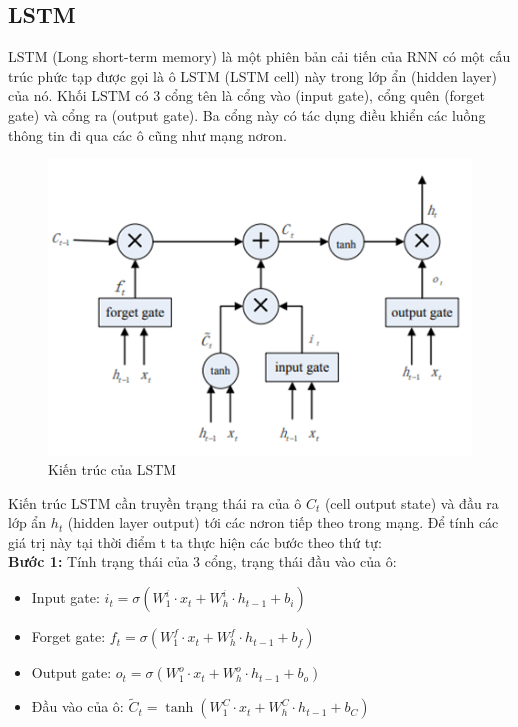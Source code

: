\documentclass[conference]{IEEEtran}
\begin{document}
\subsection{LSTM}
LSTM (Long short-term memory) là một phiên bản cải tiến của RNN có một cấu trúc phức tạp được gọi là ô LSTM (LSTM cell) này trong lớp ẩn (hidden layer) của nó. Khối LSTM có 3 cổng tên là cổng vào (input gate), cổng quên (forget gate) và cổng ra (output gate). Ba cổng này có tác dụng điều khiển các luồng thông tin đi qua các ô cũng như mạng nơron. \cite{LSTM} 
\begin{figure}[H]
    \centering
    \begin{minipage}{0.8\linewidth}
    \centering
        \vspace{0pt}
        \includegraphics[width=0.8\linewidth]{images/LSTM.png}
        \vspace{0pt}
    \caption{Kiến trúc của LSTM}
    \label{fig9}
    \end{minipage}
\end{figure}
Kiến trúc LSTM cần truyền trạng thái ra của ô $C_t$ (cell output state) và đầu ra lớp ẩn $h_t$ (hidden layer output) tới các nơron tiếp theo trong mạng. Để tính các giá trị này tại thời điểm t ta thực hiện các bước theo thứ tự: \\
\textbf{Bước 1:} Tính trạng thái của 3 cổng, trạng thái đầu vào của ô:
\begin{itemize}
    \item Input gate:
    \(
    i_t = \sigma\left(W_1^i \cdot x_t + W_h^i \cdot h_{t-1} + b_i\right)
    \)
    \item Forget gate:
    \(f_t = \sigma\left(W_1^f \cdot x_t + W_h^f \cdot h_{t-1} + b_f\right)\)
    \item Output gate:
    \(o_t = \sigma\left(W_1^o \cdot x_t + W_h^o \cdot h_{t-1} + b_o\right)\)
    \item Đầu vào của ô:
    \(\tilde{C}_t = \tanh\left(W_1^C \cdot x_t + W_h^C \cdot h_{t-1} + b_C\right)\)
\end{itemize}
\end{document}
